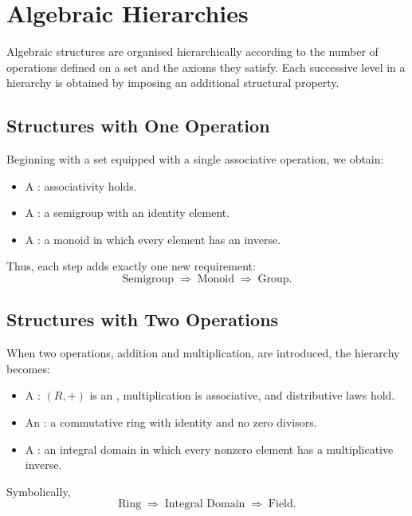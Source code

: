 \documentclass[a4paper,12pt]{article}
\theoremstyle{definition}
\begin{document}
\newpage
\section{Algebraic Hierarchies}

Algebraic structures are organised hierarchically according to the number of operations defined on a set and the axioms they satisfy. Each successive level in a hierarchy is obtained by imposing an additional structural property.

\subsection{Structures with One Operation}

Beginning with a set equipped with a single associative operation, we obtain:

\begin{itemize}
\item A : associativity holds.
\item A : a semigroup with an identity element.
\item A : a monoid in which every element has an inverse.
\end{itemize}

Thus, each step adds exactly one new requirement:
\begin{equation*}
\text{Semigroup} \;\Rightarrow\; \text{Monoid} \;\Rightarrow\; \text{Group}.
\end{equation*}

\subsection{Structures with Two Operations}

When two operations, addition and multiplication, are introduced, the hierarchy becomes:

\begin{itemize}
\item A : $(R,+)$ is an , multiplication is associative, and distributive laws hold.
\item An : a commutative ring with identity and no zero divisors.
\item A : an integral domain in which every nonzero element has a multiplicative inverse.
\end{itemize}

Symbolically,
\begin{equation*}
\text{Ring} \;\Rightarrow\; \text{Integral Domain} \;\Rightarrow\; \text{Field}.
\end{equation*}
\end{document}
